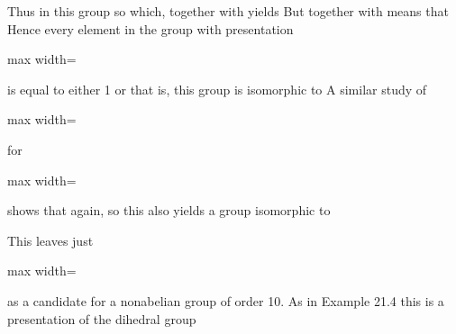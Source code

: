 \documentclass[11pt,oneside]{article}
\begin{document}
\begin{BookBody}
\noindent Thus in this group so  which, together with  yields  But  together with  means that  Hence every element in the group with presentation

\begin{center}\begin{adjustbox}{max width=\linewidth}\end{adjustbox}\end{center}

\noindent is equal to either 1 or  that is, this group is isomorphic to  A similar study of

\begin{center}\begin{adjustbox}{max width=\linewidth}\end{adjustbox}\end{center}

\noindent for

\begin{center}\begin{adjustbox}{max width=\linewidth}\end{adjustbox}\end{center}

\noindent shows that  again, so this also yields a group isomorphic to 

This leaves just

\begin{center}\begin{adjustbox}{max width=\linewidth}\end{adjustbox}\end{center}

\noindent as a candidate for a nonabelian group of order 10. As in Example 21.4 this is a presentation of the dihedral group 


\end{BookBody}
\end{document}
